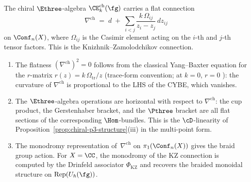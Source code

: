 \begin{proposition}
\label{prop:chiral-e3-dmod}
\ClaimStatusProvedHere
The chiral $\Ethree$-algebra
$\CE^{\mathrm{ch}}_k(\fg)$ carries a flat connection
\begin{equation}\label{eq:chiral-e3-connection}
 \nabla^{\mathrm{ch}}
 \;=\;
 d \;+\; \sum_{i < j}
 \frac{k\,\Omega_{ij}}{z_i - z_j}\,dz_{ij}
\end{equation}
on $\Conf_n(X)$, where $\Omega_{ij}$ is the Casimir element
acting on the $i$-th and $j$-th tensor factors. This is the
Knizhnik--Zamolodchikov connection.
\begin{enumerate}[label=\textup{(\roman*)}]
\item The flatness
 $(\nabla^{\mathrm{ch}})^2 = 0$ follows from the
 classical Yang--Baxter equation for the $r$-matrix
 $r(z) = k\,\Omega_{\mathrm{tr}}/z$
 \textup{(}trace-form convention; at $k = 0$, $r = 0$%
 \textup{)}: the curvature of $\nabla^{\mathrm{ch}}$
 is proportional to the LHS of the CYBE, which vanishes.
\item The $\Ethree$-algebra operations are horizontal
 with respect to $\nabla^{\mathrm{ch}}$: the cup product,
 the Gerstenhaber bracket, and the $\Pthree$ bracket are
 all flat sections of the corresponding $\Hom$-bundles.
 This is the $\cD$-linearity of
 Proposition~\textup{\ref{prop:chiral-p3-structure}(iii)}
 in the multi-point form.
\item The monodromy representation of~$\nabla^{\mathrm{ch}}$
 on $\pi_1(\Conf_n(X))$ gives the braid group action.
 For $X = \CC$, the monodromy of the KZ connection
 is computed by the Drinfeld associator
 $\Phi_{\mathrm{KZ}}$
 and recovers the braided monoidal structure on
 $\mathrm{Rep}(U_\hbar(\fg))$.
\end{enumerate}
\end{proposition}

